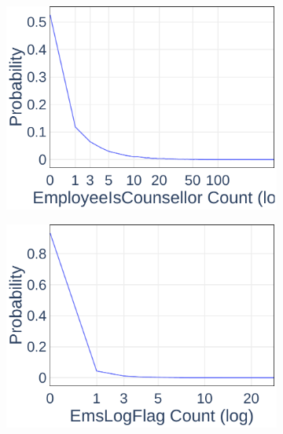 \begin{figure}[ht]
	\begin{subfigure}[b]{0.3\textwidth}
    \includegraphics[width=\textwidth]{Figures/Data-EmployeeIsCounsellor-PDF}
  \end{subfigure}
	\begin{subfigure}[b]{0.3\textwidth}
    \includegraphics[width=\textwidth]{Figures/Data-EmsLogFlag-PDF}
  \end{subfigure}
	\begin{subfigure}[b]{0.3\textwidth}

\end{subfigure}
\end{figure}
